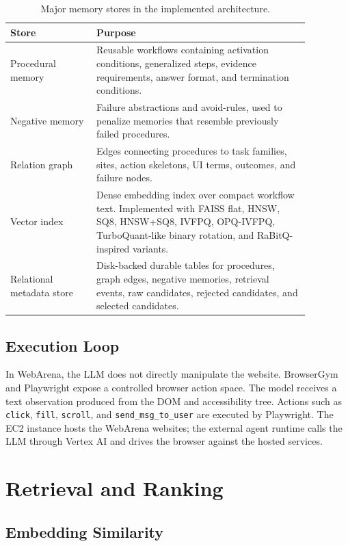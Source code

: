 \documentclass[11pt]{article}
\begin{document}
\begin{table}[h]
\centering
\small
\begin{tabular}{p{0.25\linewidth}p{0.62\linewidth}}
\toprule
\textbf{Store} & \textbf{Purpose} \\
\midrule
Procedural memory & Reusable workflows containing activation conditions, generalized steps, evidence requirements, answer format, and termination conditions. \\
Negative memory & Failure abstractions and avoid-rules, used to penalize memories that resemble previously failed procedures. \\
Relation graph & Edges connecting procedures to task families, sites, action skeletons, UI terms, outcomes, and failure nodes. \\
Vector index & Dense embedding index over compact workflow text. Implemented with FAISS flat, HNSW, SQ8, HNSW+SQ8, IVFPQ, OPQ-IVFPQ, TurboQuant-like binary rotation, and RaBitQ-inspired variants. \\
Relational metadata store & Disk-backed durable tables for procedures, graph edges, negative memories, retrieval events, raw candidates, rejected candidates, and selected candidates. \\
\bottomrule
\end{tabular}
\caption{Major memory stores in the implemented architecture.}
\label{tab:stores}
\end{table}

\subsection{Execution Loop}

In WebArena, the LLM does not directly manipulate the website. BrowserGym and Playwright expose a controlled browser action space. The model receives a text observation produced from the DOM and accessibility tree. Actions such as \texttt{click}, \texttt{fill}, \texttt{scroll}, and \texttt{send\_msg\_to\_user} are executed by Playwright. The EC2 instance hosts the WebArena websites; the external agent runtime calls the LLM through Vertex AI and drives the browser against the hosted services.

\section{Retrieval and Ranking}

\subsection{Embedding Similarity}
\end{document}
